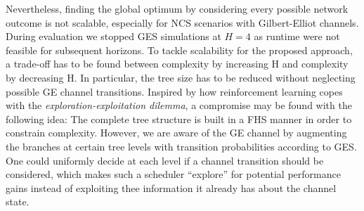 Nevertheless, finding the global optimum by considering every possible network
outcome is not scalable, especially for NCS scenarios with Gilbert-Elliot
channels. During evaluation we stopped GES simulations at $H=4$ as runtime were
not feasible for subsequent horizons. To tackle scalability for the proposed
approach, a trade-off has to be found between complexity by increasing H and
complexity by decreasing H. In particular, the tree size has to be reduced
without neglecting possible GE channel transitions. Inspired by how reinforcement
learning copes with the \textit{exploration-exploitation dilemma}, a compromise
may be found with the following idea: The complete tree structure is built in a
FHS manner in order to constrain complexity. However, we are aware of the GE
channel by augmenting the branches at certain tree levels with transition
probabilities according to GES. One could uniformly decide at each level if a
channel transition should be considered, which makes such a scheduler
``explore'' for potential performance gains instead of exploiting thee
information it already has about the channel state.
